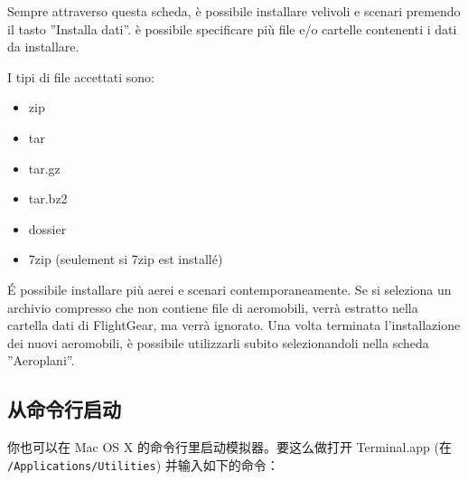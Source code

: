 \begin{itemize}
{Sempre attraverso questa scheda, \`{e} possibile installare velivoli e scenari premendo
il tasto ''Installa dati''. \`{e} possibile specificare pi\`{u} file e/o cartelle
contenenti i dati da installare.

I tipi di file accettati sono:
\begin{itemize}
\item zip
\item tar
\item tar.gz
\item tar.bz2
\item dossier
\item 7zip (seulement si 7zip est install\'{e})
\end{itemize}

\'{E} possibile installare pi\`{u} aerei e scenari contemporaneamente. Se si seleziona un
archivio compresso che non contiene file di aeromobili, verr\`{a} estratto nella
cartella dati di FlightGear, ma verr\`{a} ignorato. Una volta terminata
l'installazione dei nuovi aeromobili, \`{e} possibile utilizzarli subito
selezionandoli nella scheda ''Aeroplani''.
}{}

\ifchinese
\subsection{从命令行启动}
你也可以在 Mac OS X 的命令行里启动模拟器。要这么做打开 Terminal.app (在 \texttt{/Applications/Utilities}) 并输入如下的命令：
\fi



\end{itemize}
